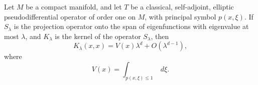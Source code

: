 \begin{comment}
    We have
    \[ \frac{\partial^N K_t(x,y)}{\partial t^N} = (2 \pi i)^N \int (\phi_1(x,y,\xi) - \phi_0(x,y,\xi))^N a(x,y,\xi) e^{2 \pi i \phi_t(x,y,\xi)}\; d\xi. \]
    Now $(\phi_1 - \phi_0)^N \cdot a$ is a symbol of order $r + N$. But on the other hand, using the fact that $(\phi_1 - \phi_0)^N \lesssim |x - y|^{2N} |\xi|^N$, and thus vanishes to order $2N$ on the diagonal, then combined with the fact that $|\nabla_\xi \phi(x,y,\xi)| \gtrsim |x - y|$, we actually see via an integration by parts $2N$ times in $\xi$ that we can rewrite the integral in terms of a symbol of order $r - N$ and the same phase $\phi_t$. Applying Taylor's theorem, we write
    \[ K(x,y) = K_1(x,y) = \sum_{k = 0}^{N-1} \frac{1}{k!} \left. \frac{\partial^k K_t(x,y)}{\partial t^k} \right|_{t = 1} + \frac{1}{N!} \int_0^1 t^{N-1} \frac{d^NK_t(x,y)}{dt^N}\; dt. \]
    This integral gives an arbitrarily smooth kernel as $N \to \infty$. Thus if we let $T$ be a pseudodifferential operator of order $r$ such that
    \[ T \sim \sum_{k = 0}^\infty \frac{1}{k!} \left. \frac{\partial^k K_t(x,y)}{\partial t^k} \right|_{t = 1}, \]
    then $T - S$ is a smoothing operator. Now if $\tilde{T}$ is the pseudodifferential operator corresponding to the symbol $a(x,x,\xi)$, then $T - \tilde{T}$, and thus $S - \tilde{T}$, is a pseudodifferential operator of order $r-1$. The converse is similar, working in the opposite direction, i.e. from $t = 1$ to $t = 0$, and is left as an exercise.
\end{proof}

%
%

\end{comment}

\begin{theorem}
    Let $M$ be a compact manifold, and let $T$ be a classical, self-adjoint, elliptic pseudodifferential operator of order one on $M$, with principal symbol $p(x,\xi)$. If $S_\lambda$ is the projection operator onto the span of eigenfunctions with eigenvalue at most $\lambda$, and $K_\lambda$ is the kernel of the operator $S_\lambda$, then
    \[ K_\lambda(x,x) = V(x) \lambda^d + O(\lambda^{d-1}), \]
    where
    \[ V(x) = \int_{p(x,\xi) \leq 1}\; d\xi. \]
\end{theorem}

